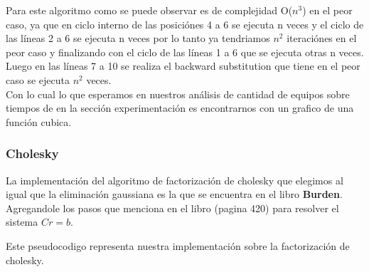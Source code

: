 Para este algoritmo como se puede observar es de complejidad O($n^3$) en el peor caso, ya que en ciclo interno de las posici\'ones 4 a 6 se ejecuta n veces
y el ciclo de las l\'ineas 2 a 6 se ejecuta n veces por lo tanto ya tendriamos $n^2$ iteraci\'ones en el peor caso y finalizando con el ciclo de las l\'ineas 1 a 6 que se ejecuta otras n veces.
Luego en las l\'ineas 7 a 10 se realiza el backward substitution que tiene en el peor caso se ejecuta $n^2$ veces.\\
Con lo cual lo que esperamos en nuestros an\'alisis de cantidad de equipos sobre tiempos de en la secci\'on experimentaci\'on es encontrarnos con un grafico de una funci\'on cubica.

\newpage
\subsubsection{Cholesky}

La implementación del algoritmo de factorizaci\'on de cholesky que elegimos al igual que la eliminaci\'on gaussiana es la que se encuentra en el libro \textbf{Burden}.
Agregandole los pasos que menciona en el libro (pagina 420) para resolver el sistema $Cr$$=$$b$.

Este pseudocodigo representa nuestra implementaci\'on sobre la factorizaci\'on de cholesky.

